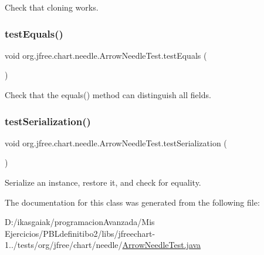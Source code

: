 Check that cloning works. \mbox{\label{classorg_1_1jfree_1_1chart_1_1needle_1_1_arrow_needle_test_a2803a1e38f7018db15b1d7dcf6a72639}} 
\subsubsection{\texorpdfstring{test\+Equals()}{testEquals()}}
{\footnotesize\ttfamily void org.\+jfree.\+chart.\+needle.\+Arrow\+Needle\+Test.\+test\+Equals (\begin{DoxyParamCaption}{ }\end{DoxyParamCaption})}

Check that the equals() method can distinguish all fields. \mbox{\label{classorg_1_1jfree_1_1chart_1_1needle_1_1_arrow_needle_test_a2aa4c62a9086156d774f0234f3f991ae}} 
\subsubsection{\texorpdfstring{test\+Serialization()}{testSerialization()}}
{\footnotesize\ttfamily void org.\+jfree.\+chart.\+needle.\+Arrow\+Needle\+Test.\+test\+Serialization (\begin{DoxyParamCaption}{ }\end{DoxyParamCaption})}

Serialize an instance, restore it, and check for equality. 

The documentation for this class was generated from the following file\+:\begin{DoxyCompactItemize}
\item 
D\+:/ikasgaiak/programacion\+Avanzada/\+Mis Ejercicios/\+P\+B\+Ldefinitibo2/libs/jfreechart-\/1../tests/org/jfree/chart/needle/\mbox{\hyperlink{_arrow_needle_test_8java}{Arrow\+Needle\+Test.\+java}}\end{DoxyCompactItemize}
